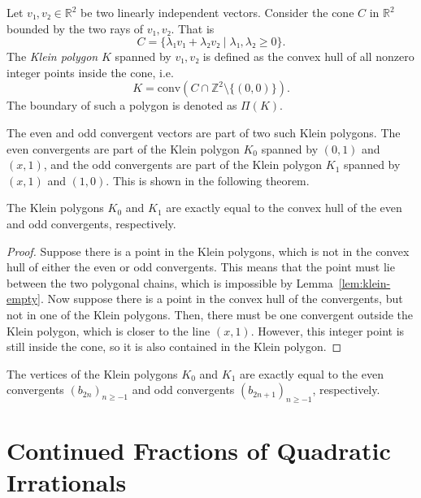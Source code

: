 \begin{definition}
  \label{def:klein-polygon}
  Let $v₁, v₂ ∈ ℝ^2$ be two linearly independent vectors.
  Consider the cone $C$ in $ℝ^2$ bounded by the two rays of $v₁, v₂$. That is
  \[
    C = \{ λ₁ v₁ + λ₂ v₂ \mid λ₁, λ₂ ≥ 0 \}.
  \]
  The \emph{Klein polygon} $K$ spanned by $v₁, v₂$ is defined as the convex hull
  of all nonzero integer points inside the cone, i.e.
  \[
    K = \mathrm{conv}(C ∩ ℤ^2 \setminus \{(0, 0)\}).
  \]
  The boundary of such a polygon is denoted as $Π(K)$.
\end{definition}

The even and odd convergent vectors are part of two such Klein polygons.
The even convergents are part of the Klein polygon $K_0$ spanned by $(0, 1)$ and $(x, 1)$,
and the odd convergents are part of the Klein polygon $K_1$ spanned by $(x, 1)$ and $(1, 0)$.
This is shown in the following theorem.

\begin{theorem}
  The Klein polygons $K_0$ and $K_1$ are exactly equal to the
  convex hull of the even and odd convergents, respectively.
\end{theorem}

\begin{proof}
  Suppose there is a point in the Klein polygons,
  which is not in the convex hull of either the even or odd convergents.
  This means that the point must lie between the two polygonal chains,
  which is impossible by Lemma~\ref{lem:klein-empty}.
  Now suppose there is a point in the convex hull of the convergents,
  but not in one of the Klein polygons.
  Then, there must be one convergent outside the Klein polygon,
  which is closer to the line $(x, 1)$.
  However, this integer point is still inside the cone,
  so it is also contained in the Klein polygon.
\end{proof}

\begin{corollary}
  The vertices of the Klein polygons $K_0$ and $K_1$ are exactly equal to the even
  convergents $(b_{2n})_{n ≥ -1}$ and odd convergents $(b_{2n+1})_{n ≥
  -1}$, respectively.
\end{corollary}

\section{Continued Fractions of Quadratic Irrationals}

